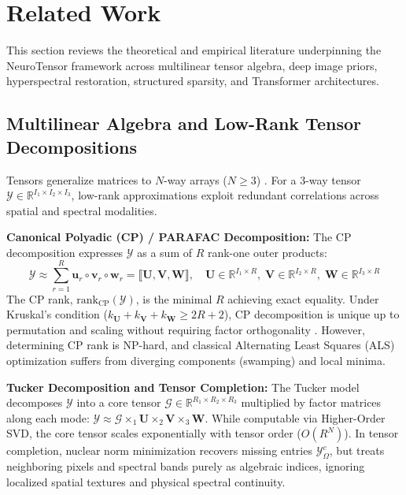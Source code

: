 \section{Related Work}
\label{sec:related_work}

This section reviews the theoretical and empirical literature underpinning the NeuroTensor framework across multilinear tensor algebra, deep image priors, hyperspectral restoration, structured sparsity, and Transformer architectures.

\subsection{Multilinear Algebra and Low-Rank Tensor Decompositions}
Tensors generalize matrices to $N$-way arrays ($N \ge 3$) \citep{kolda2009tensor}. For a 3-way tensor $\mathcal{Y} \in \mathbb{R}^{I_1 \times I_2 \times I_3}$, low-rank approximations exploit redundant correlations across spatial and spectral modalities.

\textbf{Canonical Polyadic (CP) / PARAFAC Decomposition:} The CP decomposition \citep{harshman1970foundations} expresses $\mathcal{Y}$ as a sum of $R$ rank-one outer products:
\begin{equation}
\label{eq:cp_decomposition}
\mathcal{Y} \approx \sum_{r=1}^R \mathbf{u}_r \circ \mathbf{v}_r \circ \mathbf{w}_r = \llbracket \mathbf{U}, \mathbf{V}, \mathbf{W} \rrbracket, \quad \mathbf{U} \in \mathbb{R}^{I_1 \times R}, \; \mathbf{V} \in \mathbb{R}^{I_2 \times R}, \; \mathbf{W} \in \mathbb{R}^{I_3 \times R}
\end{equation}
The CP rank, $\text{rank}_\text{CP}(\mathcal{Y})$, is the minimal $R$ achieving exact equality. Under Kruskal's condition ($k_{\mathbf{U}} + k_{\mathbf{V}} + k_{\mathbf{W}} \ge 2R + 2$), CP decomposition is unique up to permutation and scaling without requiring factor orthogonality \citep{kolda2009tensor}. However, determining CP rank is NP-hard, and classical Alternating Least Squares (ALS) optimization suffers from diverging components (swamping) and local minima.

\textbf{Tucker Decomposition and Tensor Completion:} The Tucker model \citep{tucker1966some} decomposes $\mathcal{Y}$ into a core tensor $\mathcal{G} \in \mathbb{R}^{R_1 \times R_2 \times R_3}$ multiplied by factor matrices along each mode: $\mathcal{Y} \approx \mathcal{G} \times_1 \mathbf{U} \times_2 \mathbf{V} \times_3 \mathbf{W}$. While computable via Higher-Order SVD, the core tensor scales exponentially with tensor order ($O(R^N)$). In tensor completion, nuclear norm minimization \citep{liu2013tensor} recovers missing entries $\mathcal{Y}_\Omega^c$, but treats neighboring pixels and spectral bands purely as algebraic indices, ignoring localized spatial textures and physical spectral continuity.

